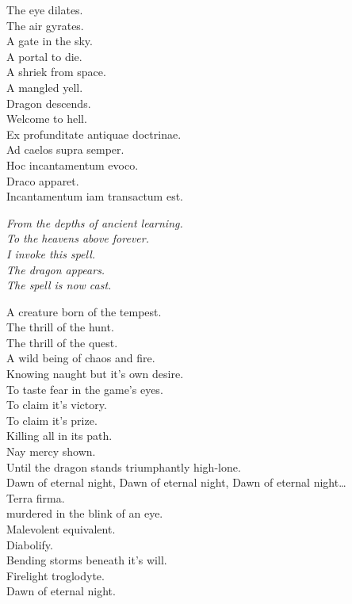 The eye dilates. \\
The air gyrates. \\
A gate in the sky. \\
A portal to die. \\
A shriek from space. \\
A mangled yell. \\
Dragon descends. \\
Welcome to hell. \\

Ex profunditate antiquae doctrinae. \\
Ad caelos supra semper. \\
Hoc incantamentum evoco. \\
Draco apparet. \\
Incantamentum iam transactum est. \\


{\itshape%
From the depths of ancient learning. \\
To the heavens above forever. \\
I invoke this spell. \\
The dragon appears. \\
The spell is now cast. \\
}

A creature born of the tempest. \\
The thrill of the hunt. \\
The thrill of the quest. \\
A wild being of chaos and fire. \\
Knowing naught but it's own desire. \\
To taste fear in the game's eyes. \\
To claim it's victory. \\
To claim it's prize. \\
Killing all in its path. \\
Nay mercy shown. \\
Until the dragon stands triumphantly high-lone. \\

Dawn of eternal night, Dawn of eternal night, Dawn of eternal night… \\

Terra firma. \\
 murdered in the blink of an eye. \\
Malevolent equivalent. \\
Diabolify. \\
Bending storms beneath it's will. \\
Firelight troglodyte. \\
Dawn of eternal night. \\

